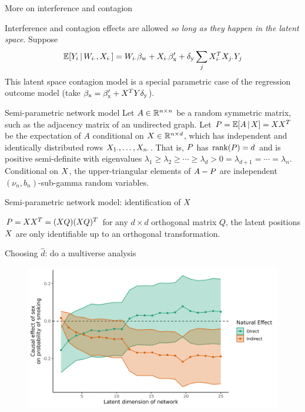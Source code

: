\documentclass{beamer}
\theoremstyle{remark}
\begin{document}
\begin{frame}{More on interference and contagion}

    Interference and contagion effects are allowed \emph{so long as they happen in the latent space}. Suppose
    \begin{align*}
        \E[\W_{i \cdot}, \X_{i \cdot}]{Y_i}
        = \W_{i \cdot} \betaw + \X_{i \cdot} \beta'_\text{x} + \delta_\text{y} \sum_{j} \X_{i \cdot}^T \X_{j \cdot} Y_j
    \end{align*}
    This latent space contagion model is a special parametric case of the regression outcome model (take $\beta_\text{x} = \beta'_\text{x} + X^T Y \delta_\text{y}$).

\end{frame}

\begin{frame}{Semi-parametric network model}
    Let $A \in \mathbb{R}^{n \times n}$ be a random symmetric matrix, such as the adjacency matrix of an undirected graph. Let $\Apop = \E[\X]{A} = \X \X^T$ be the expectation of $A$ conditional on $X \in \mathbb{R}^{n \times d}$, which has independent and identically distributed rows $X_{1 \cdot}, \dots, X_{n \cdot}$. That is, $P$ has $\rank \paren*{\Apop} = d$ and is positive semi-definite with eigenvalues $\lambda_1 \ge \lambda_2 \ge \cdots \ge \lambda_d > 0 = \lambda_{d+1} = \cdots = \lambda_n$. Conditional on $X$, the upper-triangular elements of $A - P$ are independent $(\nu_n, b_n)$-sub-gamma random variables.
\end{frame}


\begin{frame}{Semi-parametric network model: identification of $X$}

    $P = X X^T = (X Q) (X Q)^T$ for any $d \times d$ orthogonal matrix $Q$, the latent positions $X$ are only identifiable up to an orthogonal transformation.
\end{frame}

\begin{frame}{Choosing $\widehat{d}$: do a multiverse analysis}

    \centering

    \begin{figure}
        \includegraphics[width=\textwidth]{figures/glasgow-effects.png}
    \end{figure}

\end{frame}
\end{document}
